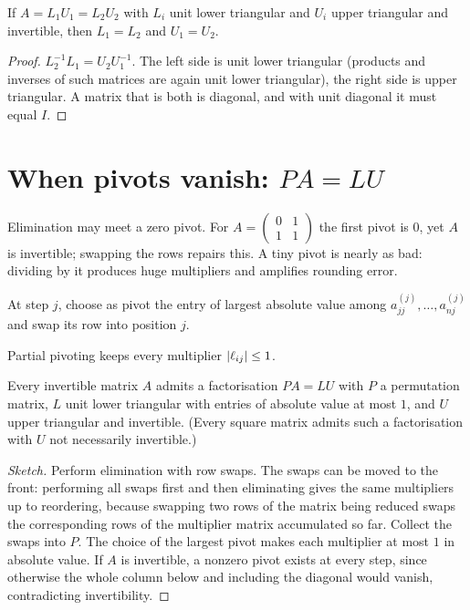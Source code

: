 \begin{theorem}[Uniqueness of $LU$]\label{thm:luuniq}
If $A=L_1U_1=L_2U_2$ with $L_i$ unit lower triangular and $U_i$ upper triangular and invertible, then $L_1=L_2$ and $U_1=U_2$.
\end{theorem}

\begin{proof}
$L_2^{-1}L_1=U_2U_1^{-1}$. The left side is unit lower triangular (products and inverses of such matrices are again unit lower triangular), the right side is upper triangular. A matrix that is both is diagonal, and with unit diagonal it must equal $I$.
\end{proof}

\section{When pivots vanish: $PA=LU$}

Elimination may meet a zero pivot. For $A=\begin{pmatrix}0&1\\1&1\end{pmatrix}$ the first pivot is $0$, yet $A$ is invertible; swapping the rows repairs this. A tiny pivot is nearly as bad: dividing by it produces huge multipliers and amplifies rounding error.

\begin{definition}
At step $j$, choose as pivot the entry of largest absolute value among $a^{(j)}_{jj},\dots,a^{(j)}_{nj}$ and swap its row into position $j$.
\end{definition}

Partial pivoting keeps every multiplier $\lvert\ell_{ij}\rvert\le1$.

\begin{theorem}[$PA=LU$]\label{thm:plu}
Every invertible matrix $A$ admits a factorisation $PA=LU$ with $P$ a permutation matrix, $L$ unit lower triangular with entries of absolute value at most $1$, and $U$ upper triangular and invertible. (Every square matrix admits such a factorisation with $U$ not necessarily invertible.)
\end{theorem}

\begin{proof}[Sketch]
Perform elimination with row swaps. The swaps can be moved to the front: performing all swaps first and then eliminating gives the same multipliers up to reordering, because swapping two rows of the matrix being reduced swaps the corresponding rows of the multiplier matrix accumulated so far. Collect the swaps into $P$. The choice of the largest pivot makes each multiplier at most $1$ in absolute value. If $A$ is invertible, a nonzero pivot exists at every step, since otherwise the whole column below and including the diagonal would vanish, contradicting invertibility.
\end{proof}

